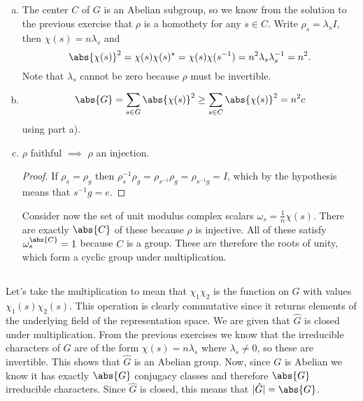 \documentclass[a4paper, oneside, 10pt]{article}
\numberwithin{Answer}{section}
\numberwithin{Exercise}{section}
\begin{document}
\subsection{}
\begin{enumerate}[a)]
    \item The center $C$ of $G$ is an Abelian subgroup, so we know from the solution to the previous exercise
        that $\rho$ is a homothety for any $s\in C$. Write $\rho_s = \lambda_s I$, then $\chi(s) = n \lambda_s$
        and 
        \[
            \abs{\chi(s)}^2 = \chi(s) \chi(s)^* = \chi(s) \chi(s^{-1}) = n^2 \lambda_s \lambda_s^{-1} = n^2.
        \]
        Note that $\lambda_s$ cannot be zero because $\rho$ must be invertible. 
    \item 
        \[
            \abs{G} = \sum_{s \in G} \abs{\chi(s)}^2 \ge \sum_{s \in C} \abs{\chi(s)}^2 = n^2c
        \]
        using part a).
    \item \mbox{}
        \begin{claim}
            $\rho$ faithful $\implies$ $\rho$ an injection.
        \end{claim}
        \begin{proof}
            If $\rho_s = \rho_g$ then $\rho_s^{-1} \rho_g = \rho_{s^{-1}} \rho_g = \rho_{s^{-1}g} = I$,
            which by the hypothesis means that $s^{-1}g = e$.
        \end{proof}
        Consider now the set of unit modulus complex scalars $\omega_s = \frac1n \chi(s)$.
        There are exactly $\abs{C}$ of these because $\rho$ is injective. 
        All of these satisfy $\omega_s^{\abs{C}} = 1$ because $C$ is a group.
        These are therefore the roots of unity, which form a cyclic group under multiplication.
\end{enumerate}

\subsection{}
Let's take the multiplication to mean that $\chi_1 \chi_2$ is the function on $G$
with values $\chi_1(s) \chi_2(s)$.
This operation is clearly commutative since it returns elements of the underlying
field of the representation space.
We are given that $\hat{G}$ is closed under multiplication.
From the previous exercises we know that the irreducible characters of $G$
are of the form $\chi(s) = n \lambda_s$ where $\lambda_s \ne 0$, so these are invertible.
This shows that $\hat{G}$ is an Abelian group.
Now, since $G$ is Abelian we know it has exactly $\abs{G}$ conjugacy classes and
therefore $\abs{G}$ irreducible characters.
Since $\hat{G}$ is closed, this means that $|\hat{G}| =\abs{G}$.
\end{document}
